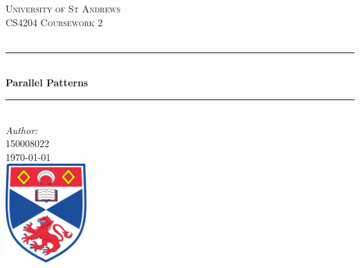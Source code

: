 \documentclass[12pt]{article}
\begin{document}
\begin{titlepage}

\newcommand{\HRule}{\rule{\linewidth}{0.5mm}} %

\center %
 

\textsc{\LARGE University of St Andrews}\\[1.5cm] %
\textsc{\Large CS4204 Coursework 2}\\[0.5cm] %
\textsc{\large }\\[0.5cm] %


\HRule \\[0.4cm]
{ \huge \bfseries Parallel Patterns}\\[0.4cm] %
\HRule \\[1.5cm]
 


\Large \emph{Author:}\\
 \textsc{150008022}\\[3cm] %


{\large \today}\\[2cm] %


\includegraphics[width = 3.1cm]{images/standrewslogo.png}
 

\vfill %

\end{titlepage}
\end{document}
